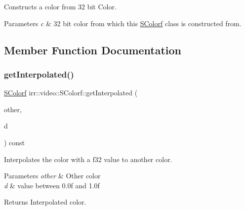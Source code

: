 Constructs a color from 32 bit Color. 


\begin{DoxyParams}{Parameters}
{\em c} & 32 bit color from which this \hyperlink{classirr_1_1video_1_1SColorf}{S\+Colorf} class is constructed from. \\
\hline
\end{DoxyParams}


\subsection{Member Function Documentation}
\mbox{\label{classirr_1_1video_1_1SColorf_a43850552a0805bcdb8c246613d251cfb}} 
\subsubsection{\texorpdfstring{get\+Interpolated()}{getInterpolated()}}
{\footnotesize\ttfamily \hyperlink{classirr_1_1video_1_1SColorf}{S\+Colorf} irr\+::video\+::\+S\+Colorf\+::get\+Interpolated (\begin{DoxyParamCaption}\item[{const \hyperlink{classirr_1_1video_1_1SColorf}{S\+Colorf} \&}]{other,  }\item[{\hyperlink{namespaceirr_a0277be98d67dc26ff93b1a6a1d086b07}{f32}}]{d }\end{DoxyParamCaption}) const\hspace{0.3cm}{\ttfamily [inline]}}



Interpolates the color with a f32 value to another color. 


\begin{DoxyParams}{Parameters}
{\em other} & Other color \\
\hline
{\em d} & value between 0.\+0f and 1.\+0f \\
\hline
\end{DoxyParams}
\begin{DoxyReturn}{Returns}
Interpolated color. 
\end{DoxyReturn}
\mbox{\label{classirr_1_1video_1_1SColorf_ae75c258ce246833bde2cbeb6c1f786a5}} 

